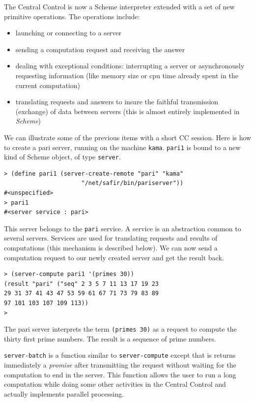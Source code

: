 \documentclass {article}
\begin{document}
The Central Control is now a Scheme interpreter extended with a set of new
primitive operations. The operations include:
\begin{itemize} 
\item launching or connecting to a server
\item sending a computation request and receiving the answer
\item dealing with exceptional conditions: interrupting a ser\-ver or
asynchronously requesting information (like  memory size or
{\sc cpu} time already spent in the current computation)
\item translating requests and answers to insure the faithful transmission 
(exchange) of data between servers (this is almost entirely
implemented in {\sl Scheme})
\end{itemize} 

We can illustrate some of the previous items with a short CC session. 
Here is how to create a {\sc pari} server, running on the machine {\tt kama}. 
{\tt pari1} is bound to a new kind of Scheme object, of type {\tt server}. 
\begin{verbatim} 
> (define pari1 (server-create-remote "pari" "kama" 
                      "/net/safir/bin/pariserver"))
#<unspecified>
> pari1
#<server service : pari>
\end{verbatim} 
This server belongs to the {\tt pari} service. A service is an abstraction
common to several servers. Services are used for translating requests and
results of computations (this mechanism is described below).
We can now send a computation request to our newly created server and get the
result back. 
\begin{verbatim} 
> (server-compute pari1 '(primes 30))
(result "pari" ("seq" 2 3 5 7 11 13 17 19 23 
29 31 37 41 43 47 53 59 61 67 71 73 79 83 89 
97 101 103 107 109 113))
> 
\end{verbatim} 
The {\sc pari} server interprets the term {\tt (primes 30)} as a request to
compute the thirty first prime numbers. 
The result is a sequence of prime numbers.

{\tt server-batch} is a function similar to {\tt server-compute} except that
is returns immediately a {\sl promise} after transmitting the request without
waiting for the computation to end in the server. 
This function allows the user to run a long computation while doing some
other activities in the Central Control and actually implements parallel
processing.
\end{document}
